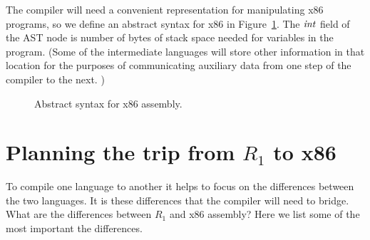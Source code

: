\documentclass[11pt]{book}
\begin{document}
The compiler will need a convenient representation for manipulating
x86 programs, so we define an abstract syntax for x86 in
Figure~\ref{fig:x86-ast-a}. The $\mathit{int}$ field of the  AST
node is number of bytes of stack space needed for variables in the
program. (Some of the intermediate languages will store other
information in that location for the purposes of communicating
auxiliary data from one step of the compiler to the next. )

\begin{figure}[tbp]
\caption{Abstract syntax for x86 assembly.}
\label{fig:x86-ast-a}
\end{figure}

\section{Planning the trip from $R_1$ to x86}
\label{sec:plan-s0-x86}

To compile one language to another it helps to focus on the
differences between the two languages. It is these differences that
the compiler will need to bridge. What are the differences between
$R_1$ and x86 assembly? Here we list some of the most important the
differences.
\end{document}
